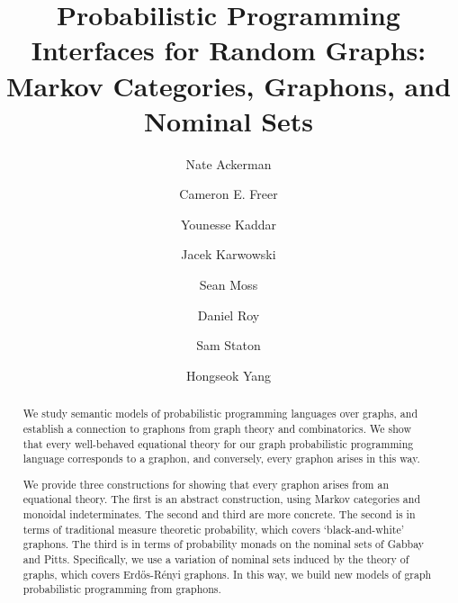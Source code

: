 \documentclass[acmsmall,screen,nonacm]{acmart}
\begin{document}
\title{Probabilistic Programming Interfaces for Random Graphs: Markov Categories, Graphons, and Nominal Sets}

\author{Nate Ackerman}

\author{Cameron E. Freer}

\author{Younesse Kaddar}

\author{Jacek Karwowski}

\author{Sean Moss}

\author{Daniel Roy}

\author{Sam Staton}

\author{Hongseok Yang}
\renewcommand{\shortauthors}{N.~Ackerman, C.~Freer, Y.~Kaddar, J.~Karwowski, S.~Moss, D.~Roy, S.~Staton, H.~Yang}


\begin{abstract}
  We study semantic models of probabilistic programming languages over
  graphs, and establish a connection to graphons from graph
  theory and combinatorics. We show that every well-behaved
  equational theory for our graph probabilistic programming language
  corresponds to a graphon, and conversely, every graphon arises in this way.
  
  We provide three constructions for showing that every graphon arises
  from an equational theory. The first is an abstract construction, using Markov
  categories and monoidal indeterminates. 
  The second and third are more concrete. 
  The second is in terms of traditional measure theoretic probability,
  which covers `black-and-white' graphons.
  The third is in terms of probability monads on the nominal sets of
  Gabbay and Pitts. Specifically, we use a variation of nominal sets
  induced by the theory of graphs, which covers Erdős-Rényi graphons. 
  In this way, we build new models of graph probabilistic
  programming from graphons. 
\end{abstract}
\end{document}
